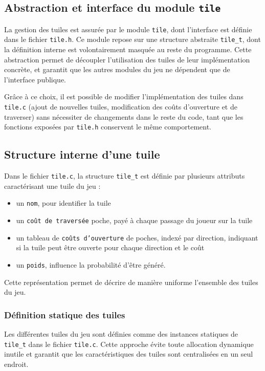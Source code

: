 
\subsection{Abstraction et interface du module \texttt{tile}}

La gestion des tuiles est assurée par le module \texttt{tile}, dont l’interface est définie dans le fichier \texttt{tile.h}. Ce module repose sur une structure abstraite \texttt{tile\_t}, dont la définition interne est volontairement masquée au reste du programme. Cette abstraction permet de découpler l’utilisation des tuiles de leur implémentation concrète, et garantit que les autres modules du jeu ne dépendent que de l’interface publique.

Grâce à ce choix, il est possible de modifier l’implémentation des tuiles dans \texttt{tile.c} (ajout de nouvelles tuiles, modification des coûts d'ouverture et de traverser) sans nécessiter de changements dans le reste du code, tant que les fonctions exposées par \texttt{tile.h} conservent le même comportement.

\subsection{Structure interne d’une tuile}

Dans le fichier \texttt{tile.c}, la structure \texttt{tile\_t} est définie par plusieurs attributs caractérisant une tuile du jeu :
\begin{itemize}
  \item un \texttt{nom}, pour identifier la tuile
  \item un \texttt{coût de traversée} poche, payé à chaque passage du joueur sur la tuile
  \item un tableau de \texttt{coûts d’ouverture} de poches, indexé par direction, indiquant si la tuile peut être ouverte pour chaque direction et le coût
  \item un \texttt{poids}, influence la probabilité d’être généré.
\end{itemize}

Cette représentation permet de décrire de manière uniforme l’ensemble des tuiles du jeu.

\subsubsection{Définition statique des tuiles}

Les différentes tuiles du jeu sont définies comme des instances statiques de \texttt{tile\_t} dans le fichier \texttt{tile.c}. Cette approche évite toute allocation dynamique inutile et garantit que les caractéristiques des tuiles sont centralisées en un seul endroit.


